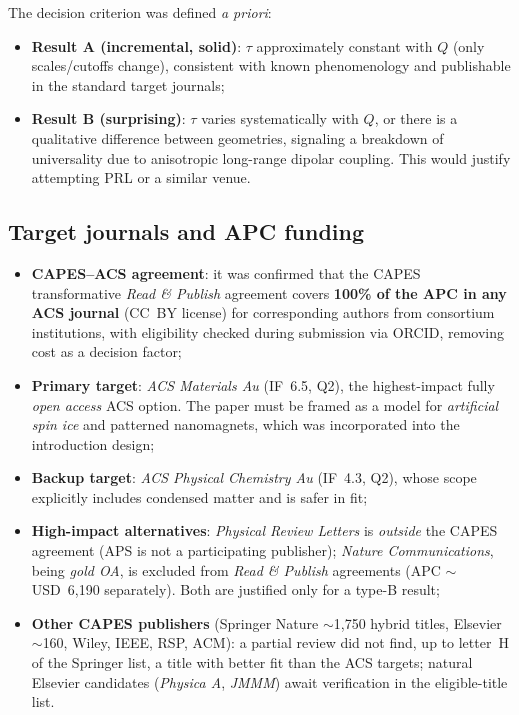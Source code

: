 \documentclass[11pt,a4paper]{article}
\begin{document}
The decision criterion was defined \emph{a priori}:
\begin{itemize}
\item \textbf{Result A (incremental, solid)}: $\tau$ approximately constant with $Q$ (only scales/cutoffs change), consistent with known phenomenology and publishable in the standard target journals;
\item \textbf{Result B (surprising)}: $\tau$ varies systematically with $Q$, or there is a qualitative difference between geometries, signaling a breakdown of universality due to anisotropic long-range dipolar coupling. This would justify attempting PRL or a similar venue.
\end{itemize}

\subsection{Target journals and APC funding}

\begin{itemize}
\item \textbf{CAPES--ACS agreement}: it was confirmed that the CAPES transformative \emph{Read \& Publish} agreement covers \textbf{100\% of the APC in any ACS journal} (CC~BY license) for corresponding authors from consortium institutions, with eligibility checked during submission via ORCID, removing cost as a decision factor;
\item \textbf{Primary target}: \emph{ACS Materials Au} (IF~6.5, Q2), the highest-impact fully \emph{open access} ACS option. The paper must be framed as a model for \emph{artificial spin ice} and patterned nanomagnets, which was incorporated into the introduction design;
\item \textbf{Backup target}: \emph{ACS Physical Chemistry Au} (IF~4.3, Q2), whose scope explicitly includes condensed matter and is safer in fit;
\item \textbf{High-impact alternatives}: \emph{Physical Review Letters} is \emph{outside} the CAPES agreement (APS is not a participating publisher); \emph{Nature Communications}, being \emph{gold OA}, is excluded from \emph{Read \& Publish} agreements (APC $\sim$ USD~6,190 separately). Both are justified only for a type-B result;
\item \textbf{Other CAPES publishers} (Springer Nature $\sim$1,750 hybrid titles, Elsevier $\sim$160, Wiley, IEEE, RSP, ACM): a partial review did not find, up to letter~H of the Springer list, a title with better fit than the ACS targets; natural Elsevier candidates (\emph{Physica A}, \emph{JMMM}) await verification in the eligible-title list.
\end{itemize}
\end{document}
